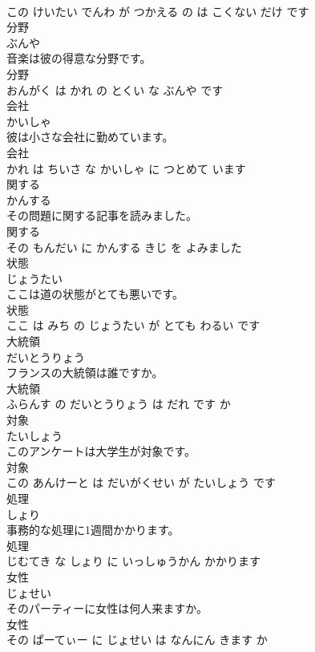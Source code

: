 \documentclass[8pt]{extreport}
\begin{document}
\begin{CJK}{UTF8}{min}
\\	この けいたい でんわ が つかえる の は こくない だけ です			
\\	分野	
\\	ぶんや			
\\	音楽は彼の得意な分野です。	
\\	分野 
\\	おんがく は かれ の とくい な ぶんや です			
\\	会社	
\\	かいしゃ			
\\	彼は小さな会社に勤めています。	
\\	会社 
\\	かれ は ちいさ な かいしゃ に つとめて います			
\\	関する	
\\	かんする			
\\	その問題に関する記事を読みました。	
\\	関する 
\\	その もんだい に かんする きじ を よみました			
\\	状態	
\\	じょうたい			
\\	ここは道の状態がとても悪いです。	
\\	状態 
\\	ここ は みち の じょうたい が とても わるい です			
\\	大統領	
\\	だいとうりょう			
\\	フランスの大統領は誰ですか。	
\\	大統領 
\\	ふらんす の だいとうりょう は だれ です か			
\\	対象	
\\	たいしょう			
\\	このアンケートは大学生が対象です。	
\\	対象 
\\	この あんけーと は だいがくせい が たいしょう です			
\\	処理	
\\	しょり			
\\	事務的な処理に1週間かかります。	
\\	処理 
\\	じむてき な しょり に いっしゅうかん かかります			
\\	女性	
\\	じょせい			
\\	そのパーティーに女性は何人来ますか。	
\\	女性 
\\	その ぱーてぃー に じょせい は なんにん きます か			

\end{CJK}
\end{document}

